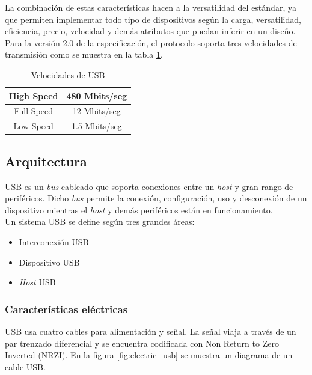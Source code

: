 La combinaci\'on de estas caracter\'isticas hacen a la versatilidad del
est\'andar, ya que permiten implementar todo tipo de dispositivos seg\'un la
carga, versatilidad, eficiencia, precio, velocidad y dem\'as atributos que
puedan inferir en un dise\~no.\\

Para la versi\'on 2.0 de la especificaci\'on, el protocolo soporta tres
velocidades de transmisi\'on como se muestra en la
tabla \ref{tab:velocidad_usb}.

\begin{table}[ht]
\centering
\begin{tabular}{|c|c|}        \hline
High Speed & 480 Mbits/seg \\ \hline 
Full Speed & 12 Mbits/seg  \\ \hline
Low Speed & 1.5 Mbits/seg  \\ \hline
\end{tabular}
\caption{Velocidades de USB} 
\label{tab:velocidad_usb}
\end{table}

\subsection{Arquitectura}

USB es un \emph{bus} cableado que soporta conexiones entre un \emph{host} y
gran rango de perif\'ericos. Dicho \emph{bus} permite la conexi\'on,
configuraci\'on, uso y desconexi\'on de un dispositivo mientras el \emph{host}
y dem\'as perif\'ericos est\'an en funcionamiento. \\

Un sistema USB se  define seg\'un tres grandes \'areas:

\begin{itemize}
 \item Interconexi\'on USB
 \item Dispositivo USB
 \item \emph{Host} USB
\end{itemize}

\subsubsection{Caracter\'isticas el\'ectricas}

USB usa cuatro cables para alimentaci\'on y se\~nal. La se\~nal viaja a
trav\'es
de un par trenzado diferencial y se encuentra codificada con Non Return to Zero
Inverted (NRZI). En la figura \ref{fig:electric_usb} se muestra un diagrama de
un cable
USB.

